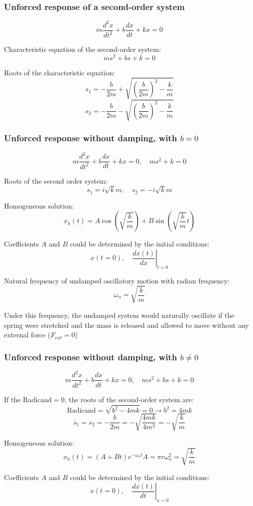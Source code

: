 \documentclass[11pt]{article}
\begin{document}
 \newpage
\subsubsection{Unforced response of a second-order system}
\label{sec:orgdee7188}
\[m \frac{d^2 x}{dt^2} + b \frac{dx}{dt} + kx = 0\]

Characteristic equation of the second-order system:
\[ms^2 + bs + k = 0\]

Roots of the characteristic equation:
\[s_1 = - \frac{b}{2m} + \sqrt{\left(\frac{b}{2m} \right)^2 - \frac{k}{m}}\]
\[s_2 = - \frac{b}{2m} - \sqrt{\left(\frac{b}{2m} \right)^2 - \frac{k}{m}}\]
\subsubsection{Unforced response without damping, with \(b = 0\)}
\label{sec:orgd124a6a}
\[m \frac{d^2 x}{dt^2} + b \frac{dx}{dt} + kx = 0, \quad ms^2 + k = 0\]

Roots of the second order system:
\[s_1 = i \sqrt{k}{m}, \quad s_2 = - i \sqrt{k}{m}\]

Homogeneous solution:
\[x_h (t) = A \cos \left(\sqrt{\frac{k}{m}} \right) + B \sin \left(\sqrt{\frac{k}{m}} t \right)\]

Coefficients \(A\) and \(B\) could be determined by the initial conditions:
\[x(t = 0), \quad \left. \frac{dx (t)}{dx} \right|_{t = 0}\]

Natural frequency of undamped oscillatory motion with radian frequency:
\[\omega_n = \sqrt{\frac{k}{m}}\]

Under this frequency, the undamped system would naturally oscillate if the spring were stretched and the mass is released and allowed to move without any external force (\(F_{ext} = 0\))
\subsubsection{Unforced response without damping, with \(b \ne 0\)}
\label{sec:org0e35e22}
\[m \frac{d^2 x}{dt^2} + b \frac{dx}{dt} + kx = 0, \quad ms^2 + bs + k = 0\]

If the \(\text{Radicand} = 0\), the roots of the second-order system are:
\[\text{Radicand} = \sqrt{b^2 - 4mk} = 0 \rightarrow b^2 = 4mk\]
\[s_1 = s_2 = - \frac{b}{2m} = - \sqrt{\frac{4mk}{4m^2}} = - \sqrt{\frac{k}{m}}\]

Homogeneous solution:
\[x_h (t) = (A + Bt) e^{- \omega_n t} A = \pi r \omega_n^2 = \sqrt{\frac{k}{m}}\]

Coefficients \(A\) and \(B\) could be determined by the initial conditions:
\[x (t = 0), \quad \left. \frac{dx (t)}{dt} \right|_{x = 0}\]
\end{document}

